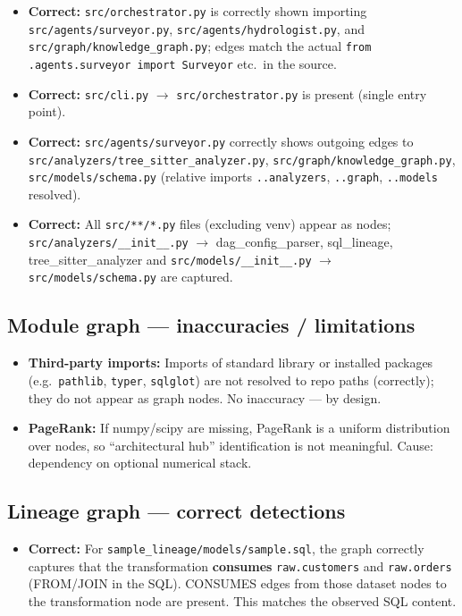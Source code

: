 \documentclass[11pt,a4paper]{article}
\begin{document}
\begin{itemize}
  \item \textbf{Correct:} \texttt{src/orchestrator.py} is correctly shown importing \texttt{src/agents/surveyor.py}, \texttt{src/agents/hydrologist.py}, and \texttt{src/graph/knowledge\_graph.py}; edges match the actual \texttt{from .agents.surveyor import Surveyor} etc.\ in the source.
  \item \textbf{Correct:} \texttt{src/cli.py} $\rightarrow$ \texttt{src/orchestrator.py} is present (single entry point).
  \item \textbf{Correct:} \texttt{src/agents/surveyor.py} correctly shows outgoing edges to \texttt{src/analyzers/tree\_sitter\_analyzer.py}, \texttt{src/graph/knowledge\_graph.py}, \texttt{src/models/schema.py} (relative imports \texttt{..analyzers}, \texttt{..graph}, \texttt{..models} resolved).
  \item \textbf{Correct:} All \texttt{src/**/*.py} files (excluding venv) appear as nodes; \texttt{src/analyzers/\_\_init\_\_.py} $\rightarrow$ dag\_config\_parser, sql\_lineage, tree\_sitter\_analyzer and \texttt{src/models/\_\_init\_\_.py} $\rightarrow$ \texttt{src/models/schema.py} are captured.
\end{itemize}

\subsection{Module graph — inaccuracies / limitations}

\begin{itemize}
  \item \textbf{Third-party imports:} Imports of standard library or installed packages (e.g.\ \texttt{pathlib}, \texttt{typer}, \texttt{sqlglot}) are not resolved to repo paths (correctly); they do not appear as graph nodes. No inaccuracy — by design.
  \item \textbf{PageRank:} If numpy/scipy are missing, PageRank is a uniform distribution over nodes, so ``architectural hub'' identification is not meaningful. Cause: dependency on optional numerical stack.
\end{itemize}

\subsection{Lineage graph — correct detections}

\begin{itemize}
  \item \textbf{Correct:} For \texttt{sample\_lineage/models/sample.sql}, the graph correctly captures that the transformation \textbf{consumes} \texttt{raw.customers} and \texttt{raw.orders} (FROM/JOIN in the SQL). CONSUMES edges from those dataset nodes to the transformation node are present. This matches the observed SQL content.
\end{itemize}
\end{document}
